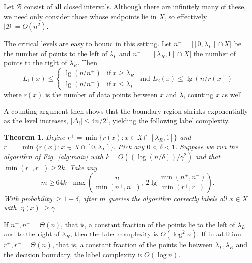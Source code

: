 \documentclass[twoside]{article}
\def\B{{\mathcal B}}
\newtheorem{thm}{Theorem}
\begin{document}
Let $\B$ consist of all closed intervals. Although there are infinitely many of these, we need only consider those whose endpoints lie in $X$, so effectively $|\B| = O(n^2)$.

The critical levels are easy to bound in this setting. Let $n^- = |[0,\lambda_L] \cap X|$  be the number of points to the left of $\lambda_L$ and $n^+ = |[\lambda_R,1] \cap X|$ the number of points to the right of $\lambda_R$. Then 
$$
L_1(x)
\leq
\left\{
\begin{array}{ll}
\lg (n/n^+) & \mbox{if $x \geq \lambda_R$} \\
\lg (n/n^-) & \mbox{if $x \leq \lambda_L$}
\end{array}
\right.
\mbox{\ \ \ \ and \ \ \ }
L_2(x)
\leq
\lg (n/r(x))
$$
where $r(x)$ is the number of data points between $x$ and $\lambda$, counting $x$ as well.

A counting argument then shows that the boundary region shrinks exponentially as the level increases, $|\Delta_\ell| \leq 4n/2^\ell$, yielding the following label complexity. 
\begin{thm}
Define $r^+ = \min \{r(x): x \in X \cap [\lambda_R,1]\}$ and $r^- = \min \{r(x): x \in X \cap [0,\lambda_L]\}$. Pick any $0 < \delta < 1$. Suppose we run the algorithm of Fig.~\ref{alg:main} with $k = O((\log (n/\delta))/\gamma^2)$ and that $\min(r^+, r^-) \geq 2k$.  Take any 
$$ m \geq 64k \cdot \max \left( \frac{n}{\min(n^+,n^-)}, \ 2 \lg \frac{\min(n^+,n^-)}{\min(r^+,r^-)} \right) .$$
With probability $\geq 1-\delta$, after $m$ queries the algorithm correctly labels all $x \in X$ with $|\eta(x)| \geq \gamma$.
\label{thm:oned-monotonic}
\end{thm}
If $n^+, n^- = \Theta(n)$, that is, a constant fraction of the points lie to the left of $\lambda_L$ and to the right of $\lambda_R$, then the label complexity is $O(\log^2 n)$. If in addition $r^+, r^- = \Theta(n)$, that is, a constant fraction of the points lie between $\lambda_L, \lambda_R$ and the decision boundary, the label complexity is $O(\log n)$. 
\end{document}
